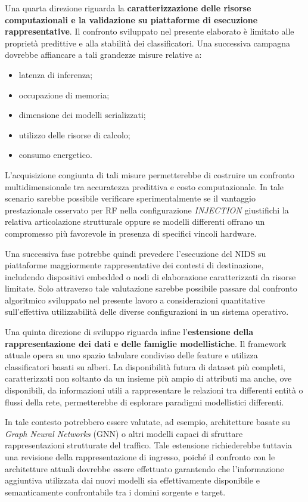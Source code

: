 Una quarta direzione riguarda la \textbf{caratterizzazione delle risorse computazionali e la validazione su piattaforme di esecuzione rappresentative}.
Il confronto sviluppato nel presente elaborato è limitato alle proprietà predittive e alla stabilità dei classificatori.
Una successiva campagna dovrebbe affiancare a tali grandezze misure relative a:
\begin{itemize}
    \item latenza di inferenza;
    \item occupazione di memoria;
    \item dimensione dei modelli serializzati;
    \item utilizzo delle risorse di calcolo;
    \item consumo energetico.
\end{itemize}

L'acquisizione congiunta di tali misure permetterebbe di costruire un confronto multidimensionale tra accuratezza predittiva e costo computazionale.
In tale scenario sarebbe possibile verificare sperimentalmente se il vantaggio prestazionale osservato per RF nella configurazione \textit{INJECTION} giustifichi la relativa articolazione strutturale oppure se modelli differenti offrano un compromesso più favorevole in presenza di specifici vincoli hardware.

Una successiva fase potrebbe quindi prevedere l'esecuzione del NIDS su piattaforme maggiormente rappresentative dei contesti di destinazione, includendo dispositivi embedded o nodi di elaborazione caratterizzati da risorse limitate.
Solo attraverso tale valutazione sarebbe possibile passare dal confronto algoritmico sviluppato nel presente lavoro a considerazioni quantitative sull'effettiva utilizzabilità delle diverse configurazioni in un sistema operativo.

Una quinta direzione di sviluppo riguarda infine l'\textbf{estensione della rappresentazione dei dati e delle famiglie modellistiche}.
Il framework attuale opera su uno spazio tabulare condiviso delle feature e utilizza classificatori basati su alberi.
La disponibilità futura di dataset più completi, caratterizzati non soltanto da un insieme più ampio di attributi ma anche, ove disponibili, da informazioni utili a rappresentare le relazioni tra differenti entità o flussi della rete, permetterebbe di esplorare paradigmi modellistici differenti.

In tale contesto potrebbero essere valutate, ad esempio, architetture basate su \textit{Graph Neural Networks} (GNN) o altri modelli capaci di sfruttare rappresentazioni strutturate del traffico.
Tale estensione richiederebbe tuttavia una revisione della rappresentazione di ingresso, poiché il confronto con le architetture attuali dovrebbe essere effettuato garantendo che l'informazione aggiuntiva utilizzata dai nuovi modelli sia effettivamente disponibile e semanticamente confrontabile tra i domini sorgente e target.

